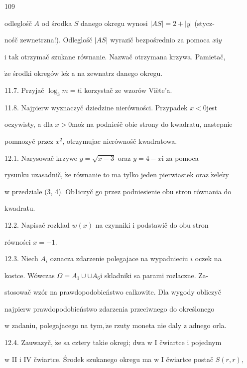 \documentclass[a4paper,12pt]{article}
\begin{document}
109

odleglośč $A$ od środka $S$ danego okregu wynosi $|AS| = 2+ |y|$ (stycz-

nośč zewnetrzna!). Odleglośč $|AS|$ wyrazič bezpośrednio za pomoca $x\mathrm{i}y$

$\mathrm{i}$ tak otrzymač szukane równanie. Nazwač otrzymana krzywa. Pamietač,

$\dot{\mathrm{z}}\mathrm{e}$ środki okregów $\mathrm{l}\mathrm{e}\dot{\mathrm{z}}$ a na zewnatrz danego okregu.

11.7. Przyjač $\log_{3}m=t\mathrm{i}$ korzystač ze wzorów Viète'a.

11.8. Najpierw wyznaczyč dziedzine nierówności. Przypadek $x<0$jest

oczywisty, a dla $x>0\mathrm{m}\mathrm{o}\dot{\mathrm{z}}$ na podnieśč obie strony do kwadratu, nastepnie

pomnozyč przez $x^{2}$, otrzymujac nierównośč kwadratowa.

12.1. Narysowač krzywe $y = \sqrt{x-3}$ oraz $y = 4-x \mathrm{i}$ za pomoca

rysunku uzasadnič, $\dot{\mathrm{z}}\mathrm{e}$ równanie to ma tylko jeden pierwiastek oraz $\dot{\mathrm{z}}\mathrm{e}\mathrm{l}\mathrm{e}\dot{\mathrm{z}}\mathrm{y}$

$\mathrm{w}$ przedziale (3, 4). Ob1iczyč go przez podniesienie obu stron równania do

kwadratu.

12.2. Napisač rozklad $w(x)$ na czynniki $\mathrm{i}$ podstawič do obu stron

równości $x=-1.$

12.3. Niech $A_{i}$ oznacza zdarzenie polegajace na wypadnieciu $i$ oczek na

kostce. Wówczas $\Omega =  A_{1}\cup \cup A_{6} \mathrm{i}$ skladniki sa parami rozlaczne. Za-

stosowač wzór na prawdopodobieństwo calkowite. Dla wygody obliczyč

najpierw prawdopodobieństwo zdarzenia przeciwnego do określonego

$\mathrm{w}$ zadaniu, polegajacego na $\mathrm{t}\mathrm{y}\mathrm{m}, \dot{\mathrm{z}}\mathrm{e}$ rzuty moneta nie daly $\dot{\mathrm{z}}$ adnego orla.

12.4. Zauwazyč, $\dot{\mathrm{z}}\mathrm{e}$ sa cztery takie okregi; dwa $\mathrm{w}$ I čwiartce $\mathrm{i}$ pojednym

$\mathrm{w}$ II $\mathrm{i}$ IV čwiartce. Środek szukanego okregu ma $\mathrm{w}$ I čwiartce postač $S(r,r),$
\end{document}
